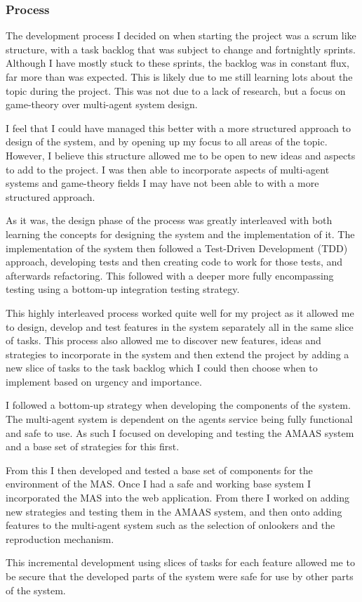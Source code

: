 \documentclass[]{final_report}
\begin{document}
\subsubsection{Process}
The development process I decided on when starting the project was a scrum like structure, with a task backlog that was subject to change and fortnightly sprints. Although I have mostly stuck to these sprints, the backlog was in constant flux, far more than was expected. This is likely due to me still learning lots about the topic during the project. This was not due to a lack of research, but a focus on game-theory over multi-agent system design.\par 
I feel that I could have managed this better with a more structured approach to design of the system, and by opening up my focus to all areas of the topic. However, I believe this structure allowed me to be open to new ideas and aspects to add to the project. I was then able to incorporate aspects of multi-agent systems and game-theory fields I may have not been able to with a more structured approach.\par 
As it was, the design phase of the process was greatly interleaved with both learning the concepts for designing the system and the implementation of it. The implementation of the system then followed a Test-Driven Development (TDD) approach, developing tests and then creating code to work for those tests, and afterwards refactoring. This followed with a deeper more fully encompassing testing using a bottom-up integration testing strategy.\par 
This highly interleaved process worked quite well for my project as it allowed me to design, develop and test features in the system separately all in the same slice of tasks. This process also allowed me to discover new features, ideas and strategies to incorporate in the system and then extend the project by adding a new slice of tasks to the task backlog which I could then choose when to implement based on urgency and importance.\par 
I followed a bottom-up strategy when developing the components of the system. The multi-agent system is dependent on the agents service being fully functional and safe to use. As such I focused on developing and testing the AMAAS system and a base set of strategies for this first.\par 
From this I then developed and tested a base set of components for the environment of the MAS. Once I had a safe and working base system I incorporated the MAS into the web application. From there I worked on adding new strategies and testing them in the AMAAS system, and then onto adding features to the multi-agent system such as the selection of onlookers and the reproduction mechanism.\par 
This incremental development using slices of tasks for each feature allowed me to be secure that the developed parts of the system were safe for use by other parts of the system.
\end{document}
